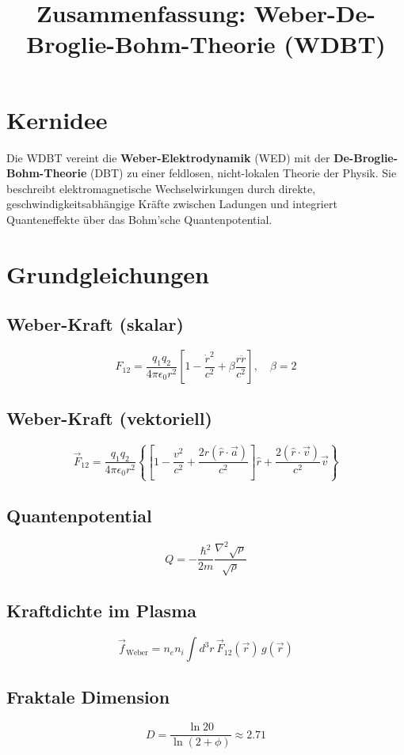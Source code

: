 \documentclass[10pt, a4paper]{article}
\title{Zusammenfassung: Weber-De-Broglie-Bohm-Theorie (WDBT)}
\author{}
\date{}
\begin{document}
\maketitle

\section*{Kernidee}
Die WDBT vereint die \textbf{Weber-Elektrodynamik} (WED) mit der \textbf{De-Broglie-Bohm-Theorie} (DBT) zu einer feldlosen, nicht-lokalen Theorie der Physik. Sie beschreibt elektromagnetische Wechselwirkungen durch direkte, geschwindigkeitsabhängige Kräfte zwischen Ladungen und integriert Quanteneffekte über das Bohm'sche Quantenpotential.

\section*{Grundgleichungen}

\subsection*{Weber-Kraft (skalar)}
\[
F_{12} = \frac{q_1 q_2}{4\pi\epsilon_0 r^2} \left[1 - \frac{\dot{r}^2}{c^2} + \beta \frac{r \ddot{r}}{c^2} \right], \quad \beta = 2
\]

\subsection*{Weber-Kraft (vektoriell)}
\[
\vec{F}_{12} = \frac{q_1 q_2}{4\pi\epsilon_0 r^2} \left\{ \left[1 - \frac{v^2}{c^2} + \frac{2r(\hat{r} \cdot \vec{a})}{c^2} \right] \hat{r} + \frac{2(\hat{r} \cdot \vec{v})}{c^2} \vec{v} \right\}
\]

\subsection*{Quantenpotential}
\[
Q = -\frac{\hbar^2}{2m} \frac{\nabla^2 \sqrt{\rho}}{\sqrt{\rho}}
\]

\subsection*{Kraftdichte im Plasma}
\[
\vec{f}_{\text{Weber}} = n_e n_i \int d^3r \, \vec{F}_{12}(\vec{r}) \, g(\vec{r})
\]

\subsection*{Fraktale Dimension}
\[
D = \frac{\ln 20}{\ln(2 + \phi)} \approx 2.71
\]
\end{document}

